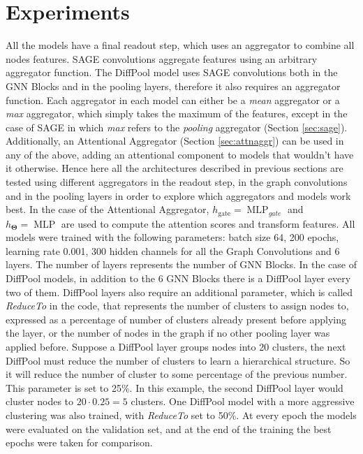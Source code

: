 \documentclass[journal]{IEEEtran}
\begin{document}
\section{Experiments}
\label{sec:exps}
All the models have a final readout step, which uses an aggregator to combine all nodes features.
SAGE convolutions aggregate features using an arbitrary aggregator function.
The DiffPool model uses SAGE convolutions both in the GNN Blocks and in the pooling layers, therefore it also requires an aggregator function.
Each aggregator in each model can either be a \textit{mean} aggregator or a \textit{max} aggregator, which simply takes the maximum of the features, except in the case of SAGE in which \textit{max} refers to the \textit{pooling} aggregator (Section \ref{sec:sage}).
Additionally, an Attentional Aggregator \cite{li2019attnaggr} (Section \ref{sec:attnaggr}) can be used in any of the above, adding an attentional component to models that wouldn't have it otherwise.
Hence here all the architectures described in previous sections are tested using different aggregators in the readout step, in the graph convolutions and in the pooling layers in order to explore which aggregators and models work best.
In the case of the Attentional Aggregator, $h_{\mathrm{gate}} = \operatorname{MLP}_{gate}$ and $h_{\mathbf{\Theta}} = \operatorname{MLP}$ are used to compute the attention scores and transform features.
All models were trained with the following parameters: batch size 64, 200 epochs, learning rate 0.001, 300 hidden channels for all the Graph Convolutions and 6 layers.
The number of layers represents the number of GNN Blocks. In the case of DiffPool models, in addition to the 6 GNN Blocks there is a DiffPool layer every two of them.
DiffPool layers also require an additional parameter, which is called \textit{ReduceTo} in the code, that represents the number of clusters to assign nodes to, expressed as a percentage of number of clusters already present before applying the layer, or the number of nodes in the graph if no other pooling layer was applied before.
Suppose a DiffPool layer groups nodes into 20 clusters, the next DiffPool must reduce the number of clusters to learn a hierarchical structure.
So it will reduce the number of cluster to some percentage of the previous number.
This parameter is set to 25\%. In this example, the second DiffPool layer would cluster nodes to $20 \cdot 0.25=5$ clusters.
One DiffPool model with a more aggressive clustering was also trained, with \textit{ReduceTo} set to 50\%.
At every epoch the models were evaluated on the validation set, and at the end of the training the best epochs were taken for comparison.
\end{document}
